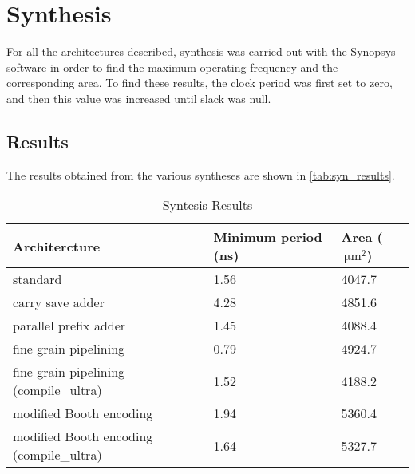 \section{Synthesis}
For all the architectures described, synthesis was carried out with the Synopsys software in order to find the maximum operating frequency and the corresponding area. To find these results, the clock period was first set to zero, and then this value was increased until slack was null.

\subsection{Results}

The results obtained from the various syntheses are shown in \autoref{tab:syn_results}.

\begin{table}[h]
\begin{center}
\begin{tabular}{|l|l|l|}
\hline
Architercture & Minimum period (ns) & Area ($\SI{}{\micro\meter}^2$)\\
\hline
standard & 1.56 & 4047.7\\
\hline
carry save adder & 4.28 & 4851.6\\
\hline
parallel prefix adder & 1.45 & 4088.4\\
\hline
fine grain pipelining & 0.79 & 4924.7\\
\hline
fine grain pipelining (compile\_ultra) & 1.52 & 4188.2\\
\hline
modified Booth encoding & 1.94 & 5360.4\\
\hline
modified Booth encoding (compile\_ultra) & 1.64 & 5327.7\\
\hline
\end{tabular}
\end{center}
\caption{Syntesis Results}
\label{tab:syn_results}
\end{table}

